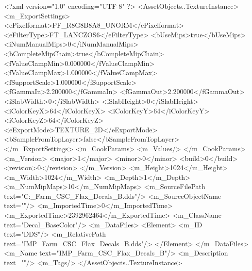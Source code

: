 <?xml version="1.0" encoding="UTF-8" ?>
<AssetObjects..TextureInstance>
	<m_ExportSettings>
		<ePixelformat>PF_R8G8B8A8_UNORM</ePixelformat>
		<eFilterType>FT_LANCZOS6</eFilterType>
		<bUseMips>true</bUseMips>
		<iNumManualMips>0</iNumManualMips>
		<bCompleteMipChain>true</bCompleteMipChain>
		<fValueClampMin>0.000000</fValueClampMin>
		<fValueClampMax>1.000000</fValueClampMax>
		<fSupportScale>1.000000</fSupportScale>
		<fGammaIn>2.200000</fGammaIn>
		<fGammaOut>2.200000</fGammaOut>
		<iSlabWidth>0</iSlabWidth>
		<iSlabHeight>0</iSlabHeight>
		<iColorKeyX>64</iColorKeyX>
		<iColorKeyY>64</iColorKeyY>
		<iColorKeyZ>64</iColorKeyZ>
		<eExportMode>TEXTURE_2D</eExportMode>
		<bSampleFromTopLayer>false</bSampleFromTopLayer>
	</m_ExportSettings>
	<m_CookParams>
		<m_Values/>
	</m_CookParams>
	<m_Version>
		<major>1</major>
		<minor>0</minor>
		<build>0</build>
		<revision>0</revision>
	</m_Version>
	<m_Height>1024</m_Height>
	<m_Width>1024</m_Width>
	<m_Depth>1</m_Depth>
	<m_NumMipMaps>10</m_NumMipMaps>
	<m_SourceFilePath text="C:\Users\Shadow\Desktop\IMP_Farm_CSC_Flax_Decals_B.dds"/>
	<m_SourceObjectName text=""/>
	<m_ImportedTime>0</m_ImportedTime>
	<m_ExportedTime>2392962464</m_ExportedTime>
	<m_ClassName text="Decal_BaseColor"/>
	<m_DataFiles>
		<Element>
			<m_ID text="DDS"/>
			<m_RelativePath text="IMP_Farm_CSC_Flax_Decals_B.dds"/>
		</Element>
	</m_DataFiles>
	<m_Name text="IMP_Farm_CSC_Flax_Decals_B"/>
	<m_Description text=""/>
	<m_Tags/>
</AssetObjects..TextureInstance>

